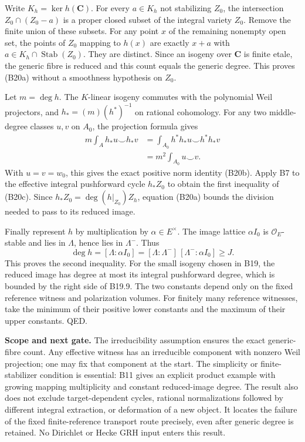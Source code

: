 \documentclass[11pt,a4paper]{article}
\theoremstyle{definition}
\begin{document}
Write \(K_h=\ker h(\mathbf C)\). For every \(a\in K_h\) not stabilizing
\(Z_0\), the intersection \(Z_0\cap(Z_0-a)\) is a proper closed subset
of the integral variety \(Z_0\). Remove the finite union of these
subsets. For any point \(x\) of the remaining nonempty open set, the
points of \(Z_0\) mapping to \(h(x)\) are exactly \(x+a\) with
\(a\in K_h\cap\operatorname{Stab}(Z_0)\). They are distinct. Since an
isogeny over \(\mathbf C\) is finite etale, the generic fibre is reduced
and this count equals the generic degree. This proves (B20a) without a
smoothness hypothesis on \(Z_0\).

Let \(m=\deg h\). The \(K\)-linear isogeny commutes with the polynomial
Weil projectors, and \(h_*=(m)(h^*)^{-1}\) on rational cohomology. For
any two middle-degree classes \(u,v\) on \(A_0\), the projection formula
gives \[
 \begin{aligned}
 m\int_A h_*u\smile h_*v
 &=\int_{A_0}h^*h_*u\smile h^*h_*v\\
 &=m^2\int_{A_0}u\smile v.
 \end{aligned}
\] With \(u=v=w_0\), this gives the exact positive norm identity (B20b).
Apply B7 to the effective integral pushforward cycle \(h_*Z_0\) to
obtain the first inequality of (B20c). Since
\(h_*Z_0=\deg(h|_{Z_0})Z_h\), equation (B20a) bounds the division needed
to pass to its reduced image.

Finally represent \(h\) by multiplication by \(\alpha\in E^\times\). The
image lattice \(\alpha I_0\) is \(\mathcal O_E\)-stable and lies in
\(\Lambda\), hence lies in \(\Lambda^-\). Thus \[
 \deg h=[\Lambda:\alpha I_0]
     =[\Lambda:\Lambda^-]\,[\Lambda^-:\alpha I_0]\ge J.
\] This proves the second inequality. For the small isogeny chosen in
B19, the reduced image has degree at most its integral pushforward
degree, which is bounded by the right side of B19.9. The two constants
depend only on the fixed reference witness and polarization volumes. For
finitely many reference witnesses, take the minimum of their positive
lower constants and the maximum of their upper constants. QED.

\textbf{Scope and next gate.} The irreducibility assumption ensures the
exact generic-fibre count. Any effective witness has an irreducible
component with nonzero Weil projection; one may fix that component at
the start. The simplicity or finite-stabilizer condition is essential:
B11 gives an explicit product example with growing mapping multiplicity
and constant reduced-image degree. The result also does not exclude
target-dependent cycles, rational normalizations followed by different
integral extraction, or deformation of a new object. It locates the
failure of the fixed finite-reference transport route precisely, even
after generic degree is retained. No Dirichlet or Hecke GRH input enters
this result.
\end{document}
